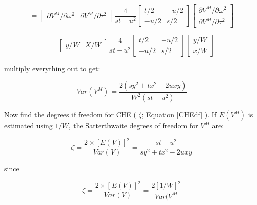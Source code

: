 \begin{equation}
    =\begin{bmatrix}
        \partial V^M/ \partial \omega^2 &
         \partial V^M/ \partial \tau^2 
    \end{bmatrix} \frac{4}{st-u^2}\begin{bmatrix}
                t/2 & -u/2 \\
                -u/2 & s/2 
            \end{bmatrix}
    \begin{bmatrix}
        \partial V^M/ \partial \omega^2 \\
         \partial V^M/ \partial \tau^2 
    \end{bmatrix}
     \nonumber
\end{equation}


\begin{equation}
    =\begin{bmatrix}
        y/W &
         X/W 
    \end{bmatrix} \frac{4}{st-u^2}\begin{bmatrix}
                t/2 & -u/2 \\
                -u/2 & s/2 
            \end{bmatrix}
    \begin{bmatrix}
        y/W \\
         x/W
    \end{bmatrix}
    \nonumber
\end{equation}

multiply everything out to get: 

\begin{equation}
    Var(V^M) = \frac{2(sy^2+tx^2-2uxy)}{W^2(st-u^2)}
\end{equation}


Now find the degrees if freedom for CHE ( $ \zeta $; Equation \ref{CHEdf} ). If $E(V^M)$ is estimated using $1/W$, the Satterthwaite degrees of freedom for $V^M$ are: 

\begin{equation}
    \zeta =  \frac{2 \times [E(V)]^2}{Var(V)} =  \frac{st - u^2}{sy^2 + tx^2 - 2uxy}
    \nonumber
\end{equation}

since 

\begin{equation}
    \zeta =  \frac{2 \times [E(V)]^2}{Var(V)} = \frac{2[1/W]^2}{Var(V^M}
    \nonumber
\end{equation}

